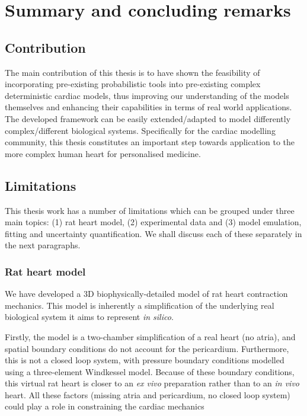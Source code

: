 \chapter{Summary and concluding remarks}\label{cha:chapter9}
%
%
%
\section{Contribution}\label{sec:ch9contribution}
The main contribution of this thesis is to have shown the feasibility of incorporating pre-existing probabilistic tools into pre-existing complex deterministic cardiac models, thus improving our understanding of the models themselves and enhancing their capabilities in terms of real world applications. The developed framework can be easily extended/adapted to model differently complex/different biological systems. Specifically for the cardiac modelling community, this thesis constitutes an important step towards application to the more complex human heart for personalised medicine. 


%
%
%
\section{Limitations}\label{sec:ch9limitations}
This thesis work has a number of limitations which can be grouped under three main topics: (1) rat heart model, (2) experimental data and (3) model emulation, fitting and uncertainty quantification. We shall discuss each of these separately in the next paragraphs.


%
%
%
\subsection{Rat heart model}\label{sec:ch9rat_heart_model}
We have developed a $3$D biophysically-detailed model of rat heart contraction mechanics. This model is inherently a simplification of the underlying real biological system it aims to represent \textit{in silico}.

\vspace{0.2cm}
Firstly, the model is a two-chamber simplification of a real heart (no atria), and spatial boundary conditions do not account for the pericardium. Furthermore, this is not a closed loop system, with pressure boundary conditions modelled using a three-element Windkessel model. Because of these boundary conditions, this virtual rat heart is closer to an \textit{ex vivo} preparation rather than to an \textit{in vivo} heart. All these factors (missing atria and pericardium, no closed loop system) could play a role in constraining the cardiac mechanics~\cite{Strocchi:2020,Augustin:2021}

